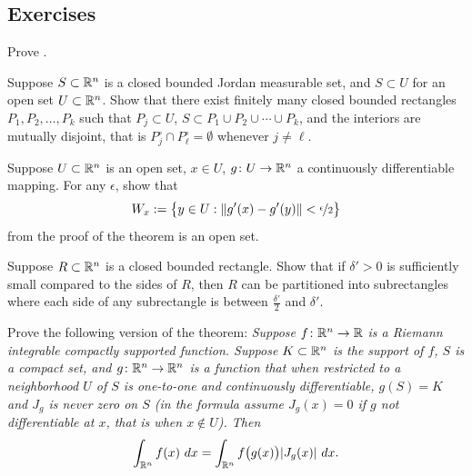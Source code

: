 \subsection{Exercises}

\begin{exercise}
Prove .
\end{exercise}

\begin{exercise}
Suppose $S \subset {\mathbb{R}}^n$ is a closed bounded Jordan measurable set,
and $S \subset U$ for an open set $U \subset {\mathbb{R}}^n$.
Show that there exist finitely many closed bounded rectangles
$P_1,P_2, \ldots, P_k$ such that $P_j \subset U$,
$S \subset P_1 \cup P_2 \cup \cdots \cup P_k$, and
the interiors are mutually disjoint, that is
$P_j^\circ \cap P^\circ_\ell = \emptyset$ whenever $j \not= \ell$.
\end{exercise}

\begin{exercise}
Suppose $U \subset {\mathbb{R}}^n$ is an open set, $x \in U$,
$g \colon U \to {\mathbb{R}}^n$ a continuously differentiable mapping.
For any $\epsilon$, show that
\begin{equation*}
W_x := \bigl\{ y \in U : \lVert {g'(x)-g'(y)} \rVert < \nicefrac{\epsilon}{2} \bigr\}
\end{equation*}
from the proof of the theorem is an open set.
\end{exercise}

\begin{exercise}
Suppose $R \subset {\mathbb{R}}^n$ is a closed bounded rectangle.
Show that if $\delta' > 0$ is sufficiently small compared
to the sides of $R$, then $R$ can be partitioned
into subrectangles where each side of any subrectangle
is between $\frac{\delta'}{2}$ and $\delta'$.
\end{exercise}

\begin{exercise}
Prove the following version of the theorem:
\emph{Suppose $f \colon {\mathbb{R}}^n \to {\mathbb{R}}$ is a Riemann integrable
compactly supported function.  Suppose $K \subset {\mathbb{R}}^n$
is the support of $f$, $S$ is a compact set,
and $g \colon {\mathbb{R}}^n \to {\mathbb{R}}^n$ is
a function that when restricted to a neighborhood $U$ of
$S$ is one-to-one and continuously differentiable,
$g(S) = K$ and $J_g$ is never zero on $S$ (in the formula 
assume $J_g(x) = 0$ if $g$ not differentiable at $x$, that is when $x \notin
U$).  Then}
\begin{equation*}
\int_{{\mathbb{R}}^{n}} f(x) ~ dx = 
\int_{{\mathbb{R}}^n} f\bigl(g(x)\bigr) \lvert {J_g(x)} \rvert ~ dx .
\end{equation*}
\end{exercise}

